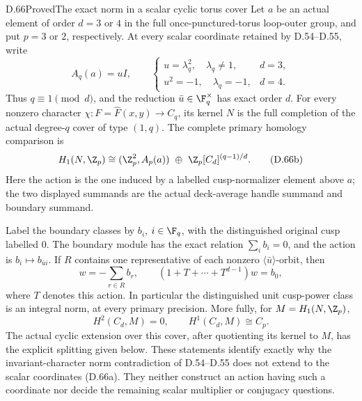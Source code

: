 \begin{claim}{D.66}{Proved}{The exact norm in a scalar cyclic torus cover}
Let $a$ be an actual element of order $d=3$ or $4$ in the
full once-punctured-torus loop-outer group, and put $p=3$
or $2$, respectively. At every scalar coordinate retained
by D.54--D.55, write
\[
 A_q(a)=uI,\qquad
 \begin{cases}
  u=\lambda_q^2,\quad \lambda_q\ne1,&d=3,\\
  u^2=-1,\quad \lambda_q=-1,&d=4.
 \end{cases}                                                   \tag{D.66a}
\]
Thus $q\equiv1\pmod d$, and the reduction $\bar u\in\F_q^\times$
has exact order $d$. For every nonzero character
$\chi:F=\widehat F(x,y)\to C_q$, its kernel $N$ is the full
completion of the actual degree-$q$ cover of type $(1,q)$.
The complete primary homology comparison is
\[
 H_1(N,\Z_p)
   \cong (\Z_p^2,A_p(a))\ \oplus\
          \Z_p[C_d]^{(q-1)/d}.                              \tag{D.66b}
\]
Here the action is the one induced by a labelled cusp-normalizer
element above $a$; the two displayed summands are the actual
deck-average handle summand and boundary summand.

Label the boundary classes by $b_i$, $i\in\F_q$, with the
distinguished original cusp labelled $0$. The boundary module
has the exact relation $\sum_i b_i=0$, and the action is
$b_i\mapsto b_{\bar u i}$. If $R$ contains one representative
of each nonzero $\langle\bar u\rangle$-orbit, then
\[
 w=-\sum_{r\in R}b_r,\qquad
 (1+T+\cdots+T^{d-1})w=b_0,                              \tag{D.66c}
\]
where $T$ denotes this action. In particular the distinguished
unit cusp-power class is an integral norm, at every primary
precision. More fully, for $M=H_1(N,\Z_p)$,
\[
 H^2(C_d,M)=0,\qquad H^1(C_d,M)\cong C_p.                \tag{D.66d}
\]
The actual cyclic extension over this cover, after quotienting
its kernel to $M$, has the explicit splitting given below.
These statements identify exactly why the invariant-character
norm contradiction of D.54--D.55 does not extend to the scalar
coordinates (D.66a). They neither construct an action having
such a coordinate nor decide the remaining scalar multiplier
or conjugacy questions.
\end{claim}

